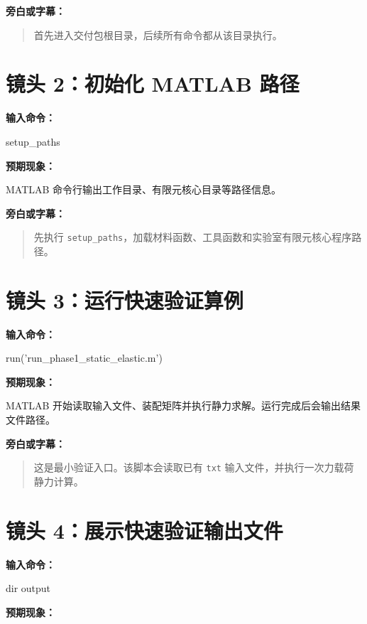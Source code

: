 \documentclass[UTF8,fontset=windows]{ctexart}
\begin{document}
\textbf{旁白或字幕：}

\begin{quote}
首先进入交付包根目录，后续所有命令都从该目录执行。
\end{quote}

\section{镜头 2：初始化 MATLAB 路径}

\textbf{输入命令：}

\begin{code}
setup_paths
\end{code}

\textbf{预期现象：}

MATLAB 命令行输出工作目录、有限元核心目录等路径信息。

\textbf{旁白或字幕：}

\begin{quote}
先执行 \texttt{setup\_paths}，加载材料函数、工具函数和实验室有限元核心程序路径。
\end{quote}

\section{镜头 3：运行快速验证算例}

\textbf{输入命令：}

\begin{code}
run('run_phase1_static_elastic.m')
\end{code}

\textbf{预期现象：}

MATLAB 开始读取输入文件、装配矩阵并执行静力求解。运行完成后会输出结果文件路径。

\textbf{旁白或字幕：}

\begin{quote}
这是最小验证入口。该脚本会读取已有 \texttt{txt} 输入文件，并执行一次力载荷静力计算。
\end{quote}

\section{镜头 4：展示快速验证输出文件}

\textbf{输入命令：}

\begin{code}
dir output
\end{code}

\textbf{预期现象：}
\end{document}

